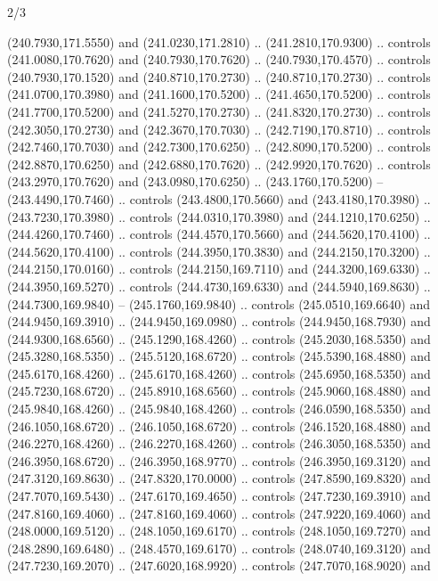 \begin{flagdescription}{2/3}
\begin{scope}[xshift=0.5\flaglength,yshift=0.5\flagwidth,scale=\flagwidth/259.2]
\begin{scope}[y=0.8pt, x=0.8pt, yscale=-1,shift={(-243,-162)}]
      (240.7930,171.5550) and (241.0230,171.2810) .. (241.2810,170.9300) .. controls
      (241.0080,170.7620) and (240.7930,170.7620) .. (240.7930,170.4570) .. controls
      (240.7930,170.1520) and (240.8710,170.2730) .. (240.8710,170.2730) .. controls
      (241.0700,170.3980) and (241.1600,170.5200) .. (241.4650,170.5200) .. controls
      (241.7700,170.5200) and (241.5270,170.2730) .. (241.8320,170.2730) .. controls
      (242.3050,170.2730) and (242.3670,170.7030) .. (242.7190,170.8710) .. controls
      (242.7460,170.7030) and (242.7300,170.6250) .. (242.8090,170.5200) .. controls
      (242.8870,170.6250) and (242.6880,170.7620) .. (242.9920,170.7620) .. controls
      (243.2970,170.7620) and (243.0980,170.6250) .. (243.1760,170.5200) --
      (243.4490,170.7460) .. controls (243.4800,170.5660) and (243.4180,170.3980) ..
      (243.7230,170.3980) .. controls (244.0310,170.3980) and (244.1210,170.6250) ..
      (244.4260,170.7460) .. controls (244.4570,170.5660) and (244.5620,170.4100) ..
      (244.5620,170.4100) .. controls (244.3950,170.3830) and (244.2150,170.3200) ..
      (244.2150,170.0160) .. controls (244.2150,169.7110) and (244.3200,169.6330) ..
      (244.3950,169.5270) .. controls (244.4730,169.6330) and (244.5940,169.8630) ..
      (244.7300,169.9840) -- (245.1760,169.9840) .. controls (245.0510,169.6640) and
      (244.9450,169.3910) .. (244.9450,169.0980) .. controls (244.9450,168.7930) and
      (244.9300,168.6560) .. (245.1290,168.4260) .. controls (245.2030,168.5350) and
      (245.3280,168.5350) .. (245.5120,168.6720) .. controls (245.5390,168.4880) and
      (245.6170,168.4260) .. (245.6170,168.4260) .. controls (245.6950,168.5350) and
      (245.7230,168.6720) .. (245.8910,168.6560) .. controls (245.9060,168.4880) and
      (245.9840,168.4260) .. (245.9840,168.4260) .. controls (246.0590,168.5350) and
      (246.1050,168.6720) .. (246.1050,168.6720) .. controls (246.1520,168.4880) and
      (246.2270,168.4260) .. (246.2270,168.4260) .. controls (246.3050,168.5350) and
      (246.3950,168.6720) .. (246.3950,168.9770) .. controls (246.3950,169.3120) and
      (247.3120,169.8630) .. (247.8320,170.0000) .. controls (247.8590,169.8320) and
      (247.7070,169.5430) .. (247.6170,169.4650) .. controls (247.7230,169.3910) and
      (247.8160,169.4060) .. (247.8160,169.4060) .. controls (247.9220,169.4060) and
      (248.0000,169.5120) .. (248.1050,169.6170) .. controls (248.1050,169.7270) and
      (248.2890,169.6480) .. (248.4570,169.6170) .. controls (248.0740,169.3120) and
      (247.7230,169.2070) .. (247.6020,168.9920) .. controls (247.7070,168.9020) and

\end{scope}
\end{scope}
\end{flagdescription}
